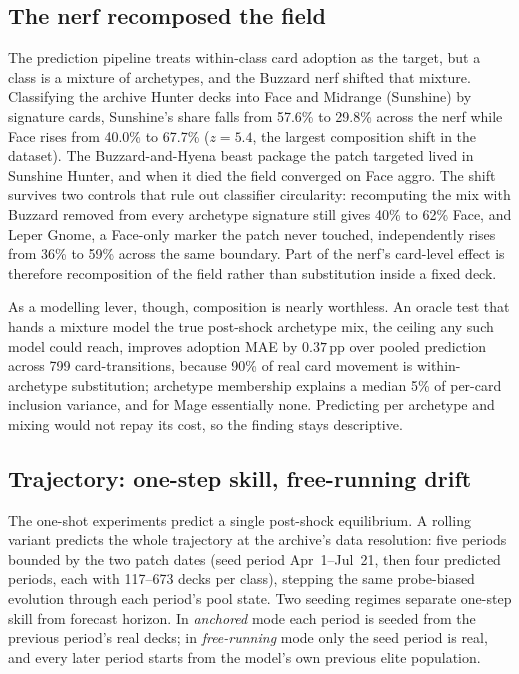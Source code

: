 \documentclass[conference]{IEEEtran}
\newcommand{\pp}{\,\text{pp}}
\begin{document}
\subsection{The nerf recomposed the field}
\label{sec:composition}
The prediction pipeline treats within-class card adoption as the
target, but a class is a mixture of archetypes, and the Buzzard nerf
shifted that mixture. Classifying the archive Hunter decks into Face
and Midrange (Sunshine) by signature cards, Sunshine's share falls
from 57.6\% to 29.8\% across the nerf while Face rises from 40.0\% to
67.7\% ($z=5.4$, the largest composition shift in the dataset). The
Buzzard-and-Hyena beast package the patch targeted lived in Sunshine
Hunter, and when it died the field converged on Face aggro. The
shift survives two controls that rule out classifier circularity:
recomputing the mix with Buzzard removed from every archetype
signature still gives 40\% to 62\% Face, and Leper Gnome, a
Face-only marker the patch never touched, independently rises from
36\% to 59\% across the same boundary. Part of the nerf's card-level
effect is therefore recomposition of the field rather than
substitution inside a fixed deck.

As a modelling lever, though, composition is nearly worthless. An
oracle test that hands a mixture model the true post-shock
archetype mix, the ceiling any such model could reach, improves
adoption MAE by $0.37\pp$ over pooled prediction across 799
card-transitions, because 90\% of real card movement is
within-archetype substitution; archetype membership explains a
median 5\% of per-card inclusion variance, and for Mage essentially
none. Predicting per archetype and mixing would not repay its cost,
so the finding stays descriptive.

\subsection{Trajectory: one-step skill, free-running drift}
\label{sec:rolling}
The one-shot experiments predict a single post-shock equilibrium. A
rolling variant predicts the whole trajectory at the archive's data
resolution: five periods bounded by the two patch dates (seed period
Apr~1--Jul~21, then four predicted periods, each with 117--673 decks
per class), stepping the same probe-biased evolution through each
period's pool state. Two seeding regimes separate one-step skill
from forecast horizon. In \emph{anchored} mode each period is seeded
from the previous period's real decks; in \emph{free-running} mode
only the seed period is real, and every later period starts from the
model's own previous elite population.
\end{document}
